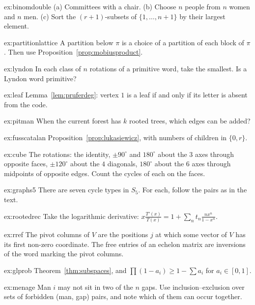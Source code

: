 \begin{hint}{ex:binomdouble}
(a) Committees with a chair. (b) Choose $n$ people from $n$ women and $n$ men. (c) Sort the $(r+1)$-subsets of $\{1,\dots,n+1\}$ by their largest
element.
\end{hint}
\begin{hint}{ex:partitionlattice}
A partition below $\pi$ is a choice of a partition of each block of $\pi$. Then use Proposition~\ref{prop:mobiusproduct}.
\end{hint}
\begin{hint}{ex:lyndon}
In each class of $n$ rotations of a primitive word, take the smallest. Is a Lyndon word primitive?
\end{hint}
\begin{hint}{ex:leaf}
Lemma~\ref{lem:pruferdeg}: vertex $1$ is a leaf if and only if its letter is absent from the code.
\end{hint}
\begin{hint}{ex:pitman}
When the current forest has $k$ rooted trees, which edges can be added?
\end{hint}
\begin{hint}{ex:fusscatalan}
Proposition~\ref{prop:lukasiewicz}, with numbers of children in $\{0,r\}$.
\end{hint}
\begin{hint}{ex:cube}
The rotations: the identity, $\pm90^\circ$ and $180^\circ$ about the $3$ axes through opposite faces, $\pm120^\circ$ about the $4$ diagonals, $180^\circ$ about the
$6$ axes through midpoints of opposite edges. Count the cycles of each on the faces.
\end{hint}
\begin{hint}{ex:graphs5}
There are seven cycle types in $S_5$. For each, follow the pairs as in the text.
\end{hint}
\begin{hint}{ex:rootedrec}
Take the logarithmic derivative: $x\frac{T'(x)}{T(x)}=1+\sum_nt_n\frac{nx^n}{1-x^n}$.
\end{hint}
\begin{hint}{ex:rref}
The pivot columns of $V$ are the positions $j$ at which some vector of $V$ has its first non-zero coordinate. The free entries of an
echelon matrix are inversions of the word marking the pivot columns.
\end{hint}
\begin{hint}{ex:glprob}
Theorem~\ref{thm:subspaces}, and $\prod(1-a_i)\ge1-\sum a_i$ for $a_i\in[0,1]$.
\end{hint}
\begin{hint}{ex:menage}
Man $i$ may not sit in two of the $n$ gaps. Use inclusion--exclusion over sets of forbidden (man, gap) pairs, and note which of them
can occur together.
\end{hint}

